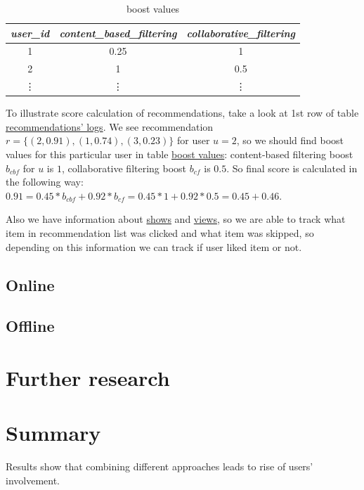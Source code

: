 \documentclass{article}
\begin{document}
    \begin{table}[h]
        \centering
        \begin{tabular}{ccc}
            \toprule
            \textit{user\_id} & \textit{content\_based\_filtering} & \textit{collaborative\_filtering} \\
            \midrule
            1                 & 0.25                                  & 1                               \\
            2                 & 1                               & 0.5                                \\
            \vdots & \vdots & \vdots \\
            \bottomrule
            \end{tabular}%
        \caption{boost values}
        \label{tab:boost_values}
    \end{table}

    To illustrate score calculation of recommendations, take a look at 1st row of table \hyperref[tab:recommendation_logs]{recommendations' logs}. We see recommendation $r = \{(2, 0.91), (1, 0.74), (3, 0.23)\}$ for user $u = 2$, so we should find boost values for this particular user in table \hyperref[tab:boost_values]{boost values}: content-based filtering boost $b_{cbf}$ for $u$ is $1$, collaborative filtering boost $b_{cf}$ is $0.5$. So final score is calculated in the following way: $0.91 = 0.45 * b_{cbf} + 0.92 * b_{cf} = 0.45 * 1 + 0.92 * 0.5 = 0.45 + 0.46$.

    Also we have information about \hyperref[tab:show]{shows} and \hyperref[tab:view]{views}, so we are able to track what item in recommendation list was clicked and what item was skipped, so depending on this information we can track if user liked item or not.



\subsection{Online}

\subsection{Offline}

\section{Further research}
\label{sec:further}

\section{Summary}
\label{sec:summary}

    Results show that combining different approaches leads to rise of users' involvement.

    


  
\end{document}

